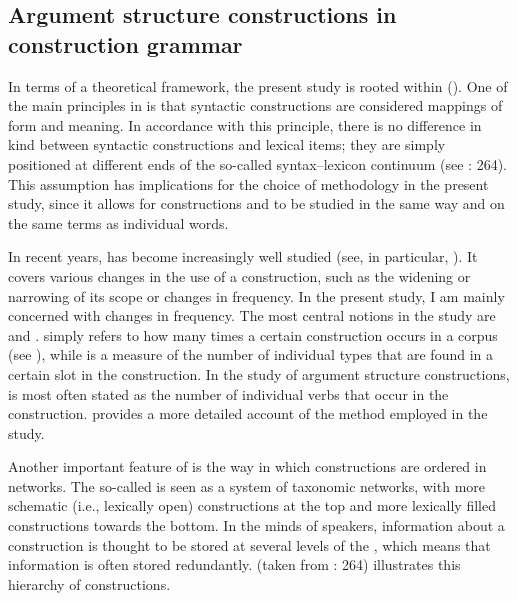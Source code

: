 \documentclass[output=paper]{langscibook}
\begin{document}
\subsection{Argument structure constructions in construction grammar}\label{sec:valdeson:3.1}


In terms of a theoretical framework, the present study is rooted within  (\citealt{BardalGildea2015}). One of the main principles in  is that syntactic constructions are considered mappings of form and meaning. In accordance with this principle, there is no difference in kind between syntactic constructions and lexical items; they are simply positioned at different ends of the so-called syntax–lexicon continuum (see \citealt{CroftCruse2004}: 264). This assumption has implications for the choice of methodology in the present study, since it allows for constructions and  to be studied in the same way and on the same terms as individual words.



In recent years,  has become increasingly well studied (see, in particular, \citealt{TraugottTrousdale2013}). It covers various changes in the use of a construction, such as the widening or narrowing of its scope or changes in frequency. In the present study, I am mainly concerned with changes in frequency. The most central notions in the study are  and .  simply refers to how many times a certain construction occurs in a corpus (see \citealt{Hilpert2013}), while  is a measure of the number of individual types that are found in a certain slot in the construction. In the study of argument structure constructions,  is most often stated as the number of individual verbs that occur in the construction.  provides a more detailed account of the method employed in the study.



Another important feature of  is the way in which constructions are ordered in networks. The so-called  is seen as a system of taxonomic networks, with more schematic (i.e., lexically open) constructions at the top and more lexically filled constructions towards the bottom. In the minds of speakers, information about a construction is thought to be stored at several levels of the , which means that information is often stored redundantly.  (taken from \citealt{CroftCruse2004}: 264) illustrates this hierarchy of constructions.
\end{document}
